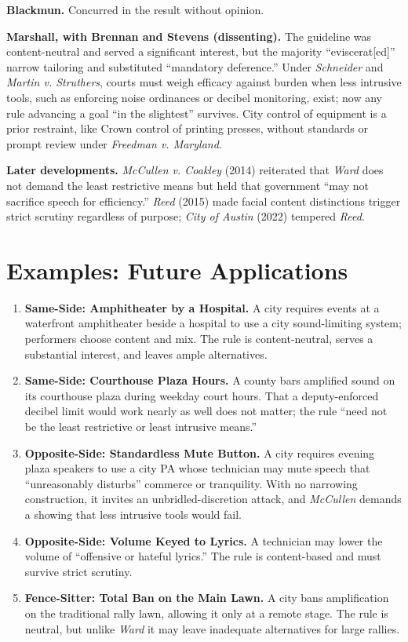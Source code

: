 \documentclass[12pt]{article}
\begin{document}
\textbf{Blackmun.} Concurred in the result without opinion.

\textbf{Marshall, with Brennan and Stevens (dissenting).} The guideline was content-neutral and served a significant interest, but the majority ``eviscerat[ed]'' narrow tailoring and substituted ``mandatory deference.'' Under \textit{Schneider} and \textit{Martin v. Struthers}, courts must weigh efficacy against burden when less intrusive tools, such as enforcing noise ordinances or decibel monitoring, exist; now any rule advancing a goal ``in the slightest'' survives. City control of equipment is a prior restraint, like Crown control of printing presses, without standards or prompt review under \textit{Freedman v. Maryland}.

\textbf{Later developments.} \textit{McCullen v. Coakley} (2014) reiterated that \textit{Ward} does not demand the least restrictive means but held that government ``may not sacrifice speech for efficiency.'' \textit{Reed} (2015) made facial content distinctions trigger strict scrutiny regardless of purpose; \textit{City of Austin} (2022) tempered \textit{Reed}.

\section{Examples: Future Applications}

\begin{enumerate}
\item \textbf{Same-Side: Amphitheater by a Hospital.} A city requires events at a waterfront amphitheater beside a hospital to use a city sound-limiting system; performers choose content and mix. The rule is content-neutral, serves a substantial interest, and leaves ample alternatives.
\item \textbf{Same-Side: Courthouse Plaza Hours.} A county bars amplified sound on its courthouse plaza during weekday court hours. That a deputy-enforced decibel limit would work nearly as well does not matter; the rule ``need not be the least restrictive or least intrusive means.''
\item \textbf{Opposite-Side: Standardless Mute Button.} A city requires evening plaza speakers to use a city PA whose technician may mute speech that ``unreasonably disturbs'' commerce or tranquility. With no narrowing construction, it invites an unbridled-discretion attack, and \textit{McCullen} demands a showing that less intrusive tools would fail.
\item \textbf{Opposite-Side: Volume Keyed to Lyrics.} A technician may lower the volume of ``offensive or hateful lyrics.'' The rule is content-based and must survive strict scrutiny.
\item \textbf{Fence-Sitter: Total Ban on the Main Lawn.} A city bans amplification on the traditional rally lawn, allowing it only at a remote stage. The rule is neutral, but unlike \textit{Ward} it may leave inadequate alternatives for large rallies.
\end{enumerate}
\end{document}
